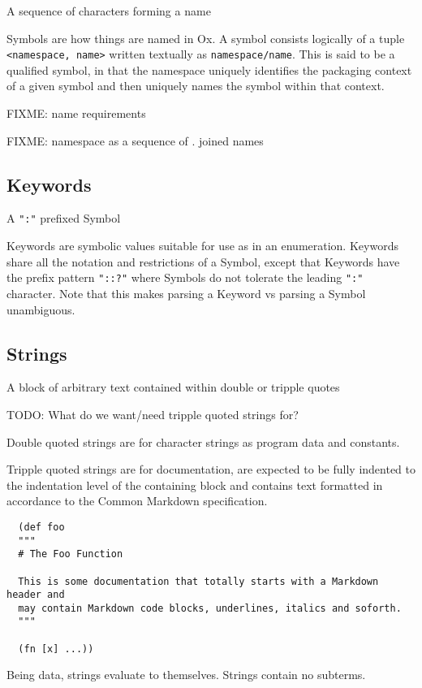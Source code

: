 \documentclass{report}
\begin{document}
A sequence of characters forming a name

Symbols are how things are named in Ox. A symbol consists logically of a tuple
\verb|<namespace, name>| written textually as \verb|namespace/name|. This is
said to be a qualified symbol, in that the namespace uniquely identifies the
packaging context of a given symbol and then uniquely names the symbol within
that context.

FIXME: name requirements

FIXME: namespace as a sequence of . joined names

\subsection{Keywords}

A \verb|":"| prefixed Symbol

Keywords are symbolic values suitable for use as in an enumeration. Keywords
share all the notation and restrictions of a Symbol, except that Keywords have
the prefix pattern \verb|"::?"| where Symbols do not tolerate the leading
\verb|":"| character. Note that this makes parsing a Keyword vs parsing a
Symbol unambiguous.

\subsection{Strings}

A block of arbitrary text contained within double or tripple quotes

TODO: What do we want/need tripple quoted strings for?

Double quoted strings are for character strings as program data and constants.

Tripple quoted strings are for documentation, are expected to be fully
indented to the indentation level of the containing block and contains text
formatted in accordance to the Common Markdown specification.

\begin{lstlisting}
  (def foo
  """
  # The Foo Function

  This is some documentation that totally starts with a Markdown header and
  may contain Markdown code blocks, underlines, italics and soforth.
  """

  (fn [x] ...))
\end{lstlisting}

Being data, strings evaluate to themselves. Strings contain no subterms.
\end{document}
